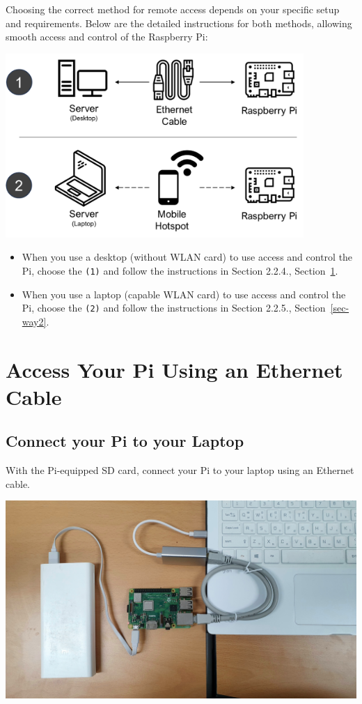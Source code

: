 \documentclass[
  letterpaper,
]{scrbook}
\begin{document}
Choosing the correct method for remote access depends on your specific
setup and requirements. Below are the detailed instructions for both
methods, allowing smooth access and control of the Raspberry Pi:

\includegraphics[width=0.85\textwidth,height=\textheight]{content/material/ch2/choose_remote.png}

\begin{itemize}
\item
  When you use a desktop (without WLAN card) to use access and control
  the Pi, choose the \texttt{(1)} and follow the instructions in Section
  2.2.4., Section~\ref{sec-way1}.
\item
  When you use a laptop (capable WLAN card) to use access and control
  the Pi, choose the \texttt{(2)} and follow the instructions in Section
  2.2.5., Section~\ref{sec-way2}.
\end{itemize}

\hypertarget{sec-way1}{%
\section{Access Your Pi Using an Ethernet Cable}\label{sec-way1}}

\hypertarget{connect-your-pi-to-your-laptop}{%
\subsection{Connect your Pi to your
Laptop}\label{connect-your-pi-to-your-laptop}}

With the Pi-equipped SD card, connect your Pi to your laptop using an
Ethernet cable.

\includegraphics{content/material/ch2/connect_pi.jpg}
\end{document}
